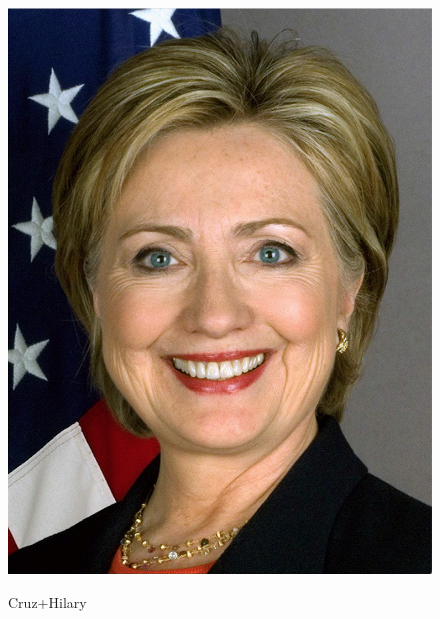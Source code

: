 \documentclass[a4paper]{article}
\begin{document}
\begin{figure}[htp]
{\begin{minipage}[b]{0.31\columnwidth}
{\includegraphics[width=1\columnwidth]{face_morphing/hillary.png}
}
\label{fig:3-3:c}
\end{minipage}
}
\caption{Cruz+Hilary}
\label{fig:3-3}
\end{figure}
\end{document}
